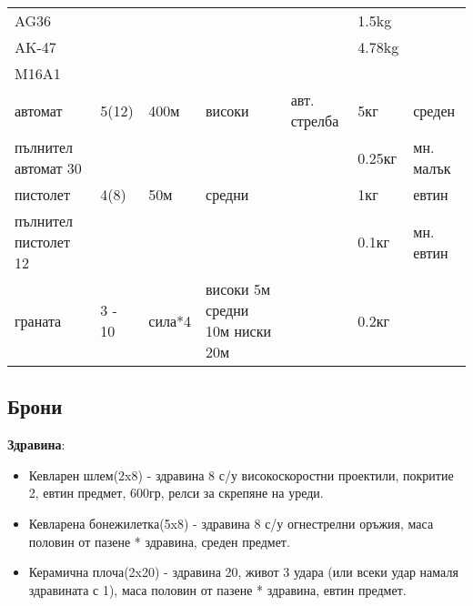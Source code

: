 \begin{tabular}{p{2cm} | p{2cm} | p{2cm} | p{2cm} | p{2cm} | p{2cm} | p{2cm}}
AG36                  &                      &            &            &                & 1.5kg         &                  \\  %
AK-47                 &                      &            &            &                & 4.78kg        &                  \\  %
M16A1                 &                      &            &            &                &               &                  \\  %
%
автомат               & 5(12)                & 400м       & високи     & авт. стрелба   & 5кг           & среден           \\
пълнител автомат 30   &                      &            &            &                & 0.25кг        & мн. малък        \\
пистолет              & 4(8)                 & 50м        & средни     &                & 1кг           & евтин            \\  %
пълнител пистолет 12  &                      &            &            &                & 0.1кг         & мн. евтин        \\
граната               & 3 - 10               & сила*4     & високи 5м средни 10м ниски 20м & & 0.2кг    &                  \\

\end{tabular}

\subsection{Брони}
\textbf{Здравина}:
\begin{itemize}[topsep=-0cm, partopsep=0cm, parsep=0cm, itemsep=0cm]
\item{Кевларен шлем(2x8) - здравина 8 с/у високоскоростни проектили, покритие 2, евтин предмет, 600гр, релси за скрепяне на уреди.}
\item{Кевларена бонежилетка(5x8) - здравина 8 с/у огнестрелни оръжия, маса половин от пазене * здравина, среден предмет.}
\item{Керамична плоча(2x20) - здравина 20, живот 3 удара (или всеки удар намаля здравината с 1), маса половин от пазене * здравина, евтин предмет.}
\end{itemize}
